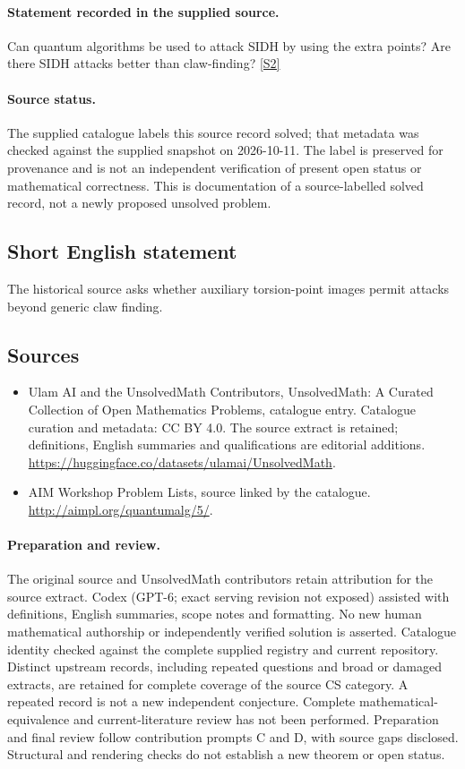\documentclass[11pt]{article}
\begin{document}
\paragraph{Statement recorded in the supplied source.}
Can quantum algorithms be used to attack SIDH by using the extra points? Are there SIDH attacks better than claw-finding? \href{http://aimpl.org/quantumalg/5/}{[S2]}
\paragraph{Source status.}
The supplied catalogue labels this source record solved; that metadata was checked against the supplied snapshot on 2026-10-11. The label is preserved for provenance and is not an independent verification of present open status or mathematical correctness. This is documentation of a source-labelled solved record, not a newly proposed unsolved problem.
\subsection{Short English statement}
The historical source asks whether auxiliary torsion-point images permit attacks beyond generic claw finding.
\subsection{Sources}
\begin{itemize}
\item[S1] Ulam AI and the UnsolvedMath Contributors, UnsolvedMath: A Curated Collection of Open Mathematics Problems, catalogue entry. Catalogue curation and metadata: CC BY 4.0. The source extract is retained; definitions, English summaries and qualifications are editorial additions.
\url{https://huggingface.co/datasets/ulamai/UnsolvedMath}.
\item[S2] AIM Workshop Problem Lists, source linked by the catalogue.
\url{http://aimpl.org/quantumalg/5/}.
\end{itemize}
\paragraph{Preparation and review.}
The original source and UnsolvedMath contributors retain attribution for the source extract. Codex (GPT-6; exact serving revision not exposed) assisted with definitions, English summaries, scope notes and formatting. No new human mathematical authorship or independently verified solution is asserted. Catalogue identity checked against the complete supplied registry and current repository. Distinct upstream records, including repeated questions and broad or damaged extracts, are retained for complete coverage of the source CS category. A repeated record is not a new independent conjecture. Complete mathematical-equivalence and current-literature review has not been performed. Preparation and final review follow contribution prompts C and D, with source gaps disclosed. Structural and rendering checks do not establish a new theorem or open status.
\label{end:statement}
\end{document}
